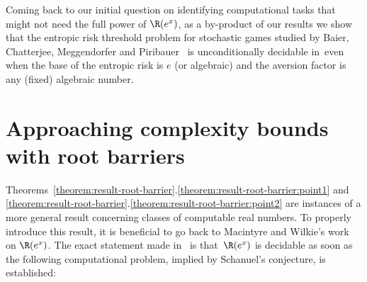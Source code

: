 

Coming back to our initial question on identifying computational tasks that
might not need the full power of $\R(e^x)$, as a by-product of our results we
show that the entropic risk threshold problem for stochastic games
studied by Baier, Chatterjee, Meggendorfer and Piribauer~\cite{BaierCMP23} is
unconditionally decidable in~\exptime even when the base of the entropic risk is
$e$ (or algebraic) and the aversion factor is any (fixed) algebraic number.

\section{Approaching complexity bounds with root barriers}\label{section:intro-to-root-barriers}
Theorems~\ref{theorem:result-root-barrier}.\ref{theorem:result-root-barrier:point1}
and \ref{theorem:result-root-barrier}.\ref{theorem:result-root-barrier:point2}
are instances of a more general result concerning classes of computable real
numbers. To properly introduce this result, it is beneficial to go back to
Macintyre and Wilkie's work on $\R(e^x)$. The exact statement made
in~\cite{MacWilkie96} is that~$\R(e^x)$ is decidable as soon as the following
computational problem, implied by Schanuel's conjecture, is established:

